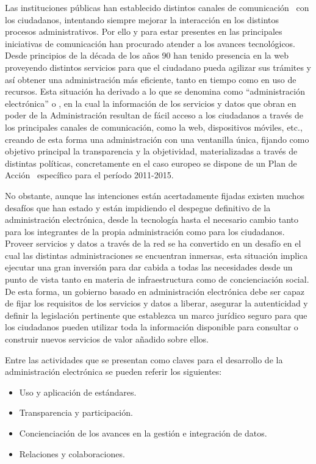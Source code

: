 Las instituciones públicas han establecido distintos canales de comunicación~\cite{improvingW3c}
con los ciudadanos, intentando siempre mejorar la interacción en los distintos
procesos administrativos. Por ello y para estar presentes en las principales iniciativas
de comunicación han procurado atender a los avances tecnológicos. Desde
principios de la década de los años 90 han tenido presencia en la web proveyendo
distintos servicios para que el ciudadano pueda agilizar sus trámites
y así obtener una administración más eficiente, tanto en tiempo como en uso
de recursos. Esta situación ha derivado a lo que se denomina como ``administración
electrónica'' o \egov, en la cual la información de los servicios
y datos que obran en poder de la Administración resultan de fácil acceso a los
 ciudadanos a través de los principales canales de comunicación, 
como la web, dispositivos móviles, etc., creando de esta forma
una administración con una ventanilla única, fijando como objetivo principal
 la transparencia y la objetividad, materializadas a través de distintas
políticas, concretamente en el caso europeo se dispone de un Plan de Acción~\cite{policy-eu} específico para el período 2011-2015.

No obstante, aunque las intenciones están acertadamente fijadas existen muchos
desafíos que han estado y están impidiendo el despegue definitivo de la administración
electrónica, desde la tecnología hasta el necesario cambio tanto para los
integrantes de la propia administración como para los ciudadanos. Proveer
servicios y datos a través de la red se ha convertido en un desafío en el cual
las distintas administraciones se encuentran inmersas, esta situación
implica ejecutar una gran inversión para dar cabida a todas las necesidades desde un punto
de vista tanto en materia de infraestructura como de concienciación social. De esta forma,
un gobierno basado en administración electrónica debe ser capaz de fijar los requisitos
de los servicios y datos a liberar, asegurar la autenticidad y definir la legislación
pertinente que establezca un marco jurídico seguro para que los ciudadanos pueden utilizar
toda la información disponible para consultar o construir nuevos servicios de valor
añadido sobre ellos.

Entre las actividades que se presentan como claves para el desarrollo de la administración
electrónica se pueden referir los siguientes:
\begin{itemize}
 \item Uso y aplicación de estándares.
 \item Transparencia y participación.
 \item Concienciación de los avances en la gestión e integración de datos.
 \item Relaciones y colaboraciones.
\end{itemize}


